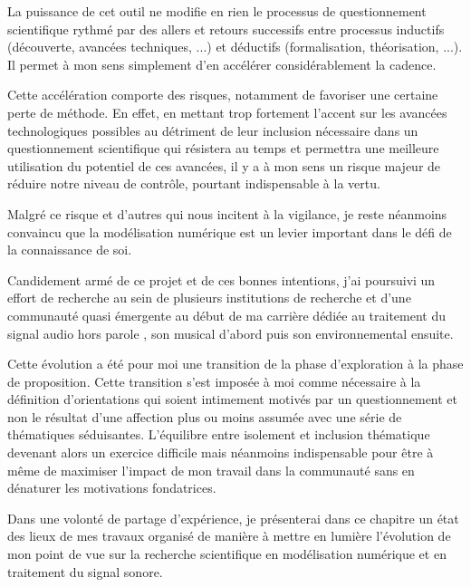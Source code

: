 La puissance de cet outil ne modifie en rien le processus de questionnement scientifique rythmé par des allers et retours successifs entre processus inductifs (découverte, avancées techniques, ...) et déductifs (formalisation, théorisation, ...). Il permet à mon sens simplement d'en accélérer considérablement la cadence.

Cette accélération comporte des risques, notamment de favoriser une certaine perte de méthode. En effet, en mettant trop fortement l'accent sur les avancées technologiques possibles au détriment de leur inclusion nécessaire dans un questionnement scientifique qui résistera au temps et permettra une meilleure utilisation du potentiel de ces avancées, il y a à mon sens un risque majeur de réduire notre niveau de contrôle, pourtant indispensable à la vertu.

Malgré ce risque et d'autres qui nous incitent à la vigilance, je reste néanmoins convaincu que la modélisation numérique est un levier important dans le défi de la connaissance de soi.

Candidement armé de ce projet et de ces bonnes intentions, j'ai poursuivi un effort de recherche au sein de plusieurs institutions de recherche et d'une communauté quasi émergente au début de ma carrière dédiée au traitement du signal audio \og hors parole \fg, son musical d'abord puis son environnemental ensuite. %

Cette évolution a été pour moi une transition de la phase d'exploration à la phase de proposition. Cette transition s'est imposée à moi comme nécessaire à la définition d'orientations qui soient intimement motivés par un questionnement et non le résultat d'une affection plus ou moins assumée avec une série de thématiques séduisantes. L'équilibre entre isolement et inclusion thématique devenant alors un exercice difficile mais néanmoins indispensable pour être à même de maximiser l'impact de mon travail dans la communauté sans en dénaturer les motivations fondatrices.

Dans une volonté de partage d'expérience, je présenterai dans ce chapitre un état des lieux de mes travaux organisé de manière à mettre en lumière l'évolution de mon point de vue sur la recherche scientifique en modélisation numérique et en traitement du signal sonore.

